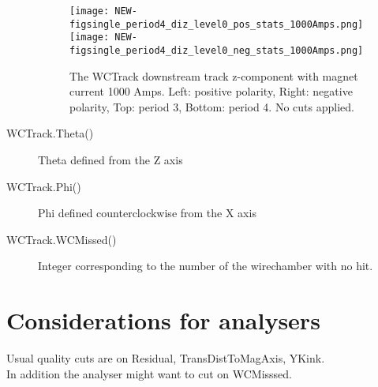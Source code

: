 \begin{description}
{\begin{figure}[h]
 	\texttt{[image: NEW-figsingle\_period4\_diz\_level0\_pos\_stats\_1000Amps.png]}
	 \texttt{[image: NEW-figsingle\_period4\_diz\_level0\_neg\_stats\_1000Amps.png]}
   \caption[short]{The WCTrack downstream track z-component with magnet current 1000 Amps. Left: positive polarity, Right: negative polarity, Top: period 3, Bottom: period 4. No cuts applied.}
   \label{fig_diz}
  \end{figure}
  
}
\item[WCTrack.Theta()]{
Theta defined from the Z axis 
}
\item[WCTrack.Phi()]{
Phi defined counterclockwise from the X axis 
}

        

         
\item[WCTrack.WCMissed()]{
Integer corresponding to the number of the wirechamber with no hit.
}
\end{description}
 

 
  \section{Considerations for analysers}
  
  Usual quality cuts are on Residual, TransDistToMagAxis, YKink.\\
  
  In addition the analyser might want to cut on WCMisssed.



